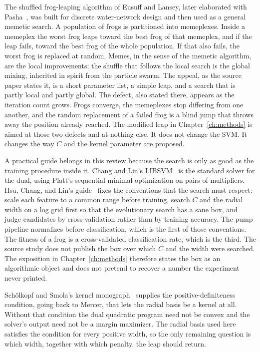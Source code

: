 The shuffled frog-leaping algorithm of Eusuff and Lansey, later elaborated with Pasha~\cite{eusuff2003,eusuff2006}, was built for discrete water-network design and then used as a general memetic search.
A population of frogs is partitioned into memeplexes.
Inside a memeplex the worst frog leaps toward the best frog of that memeplex, and if the leap fails, toward the best frog of the whole population.
If that also fails, the worst frog is replaced at random.
Memes, in the sense of the memetic algorithm, are the local improvements; the shuffle that follows the local search is the global mixing, inherited in spirit from the particle swarm.
The appeal, as the source paper states it, is a short parameter list, a simple leap, and a search that is partly local and partly global.
The defect, also stated there, appears as the iteration count grows.
Frogs converge, the memeplexes stop differing from one another, and the random replacement of a failed frog is a blind jump that throws away the position already reached.
The modified leap in Chapter~\ref{ch:methods} is aimed at those two defects and at nothing else.
It does not change the SVM.
It changes the way \(C\) and the kernel parameter are proposed.

A practical guide belongs in this review because the search is only as good as the training procedure inside it.
Chang and Lin's LIBSVM~\cite{chang2011,platt1999} is the standard solver for the dual, using Platt's sequential minimal optimization on pairs of multipliers.
Hsu, Chang, and Lin's guide~\cite{hsu2003} fixes the conventions that the search must respect: scale each feature to a common range before training, search \(C\) and the radial width on a log grid first so that the evolutionary search has a sane box, and judge candidates by cross-validation rather than by training accuracy.
The pump pipeline normalizes before classification, which is the first of those conventions.
The fitness of a frog is a cross-validated classification rate, which is the third.
The source study does not publish the box over which \(C\) and the width were searched.
The exposition in Chapter~\ref{ch:methods} therefore states the box as an algorithmic object and does not pretend to recover a number the experiment never printed.

Schölkopf and Smola's kernel monograph~\cite{scholkopf2002,mercer1909} supplies the positive-definiteness condition, going back to Mercer, that lets the radial basis be a kernel at all.
Without that condition the dual quadratic program need not be convex and the solver's output need not be a margin maximizer.
The radial basis used here satisfies the condition for every positive width, so the only remaining question is which width, together with which penalty, the leap should return.

